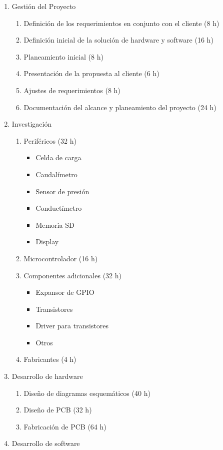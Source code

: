 \documentclass[
11pt, %
]{charter}
\begin{document}
\begin{enumerate}
\item Gestión del Proyecto 
	\begin{enumerate}	
	\item Definición de los requerimientos en conjunto con el cliente (8 h)
	\item Definición inicial de la solución de hardware y software (16 h)
	\item Planeamiento inicial (8 h)
	\item Presentación de la propuesta al cliente (6 h)
	\item Ajustes de requerimientos (8 h)
	\item Documentación del alcance y planeamiento del proyecto (24 h)
	\end{enumerate}
\item Investigación
	\begin{enumerate}
	\item Periféricos (32 h)
		\begin{itemize}
			\item Celda de carga
			\item Caudalímetro
			\item Sensor de presión
			\item Conductímetro
			\item Memoria SD
			\item Display
		\end{itemize}
	\item Microcontrolador (16 h)
	\item Componentes adicionales (32 h)
		\begin{itemize}
			\item Expansor de GPIO
			\item Transistores
			\item Driver para transistores
			\item Otros
		\end{itemize}
	\item Fabricantes (4 h)
	\end{enumerate}
\item Desarrollo de hardware
	\begin{enumerate}
	\item Diseño de diagramas esquemáticos (40 h)
	\item Diseño de PCB (32 h)
	\item Fabricación de PCB (64 h)
	\end{enumerate}
\item Desarrollo de software

\end{enumerate}
\end{document}
